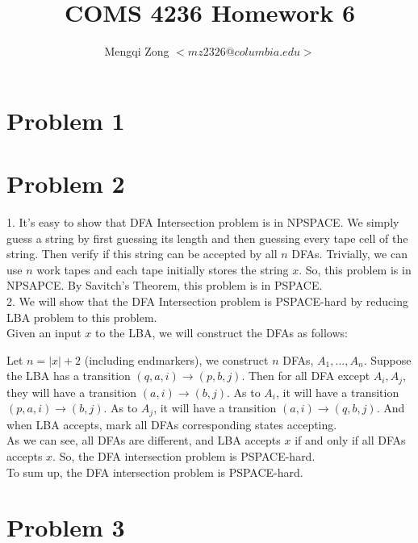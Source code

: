 \documentclass[12pt]{article}
\title{COMS 4236 Homework 6}
\author{Mengqi Zong $<mz2326@columbia.edu>$}
\begin{document}
\maketitle

\setlength{\parindent}{0in}

\section*{Problem 1}



\section*{Problem 2}

1. It's easy to show that DFA Intersection problem is in NPSPACE. We
simply guess a string by first guessing its length and then guessing
every tape cell of the string. Then verify if this string can be
accepted by all $n$ DFAs. Trivially, we can use $n$ work tapes and
each tape initially stores the string $x$. So, this problem is in
NPSAPCE. By Savitch's Theorem, this problem is in PSPACE. \\

2. We will show that the DFA Intersection problem is PSPACE-hard
by reducing LBA problem to this problem. \\

Given an input $x$ to the LBA, we will construct the DFAs as follows:

Let $n = |x| + 2$ (including endmarkers), we construct $n$ DFAs,
$A_1,...,A_n$. Suppose the LBA has a transition $(q, a, i) \rightarrow
(p, b, j)$. Then for all DFA except $A_i, A_j$, they will have a
transition $(a, i) \rightarrow (b, j)$. As to $A_i$, it will have a
transition $(p, a, i) \rightarrow (b, j)$. As to $A_j$, it will have a
transition $(a, i) \rightarrow (q, b, j)$. And when LBA accepts, mark
all DFAs corresponding states accepting. \\

As we can see, all DFAs are different, and LBA accepts $x$ if and only
if all DFAs accepts $x$. So, the DFA intersection problem is
PSPACE-hard. \\

To sum up, the DFA intersection problem is PSPACE-hard.  

\section*{Problem 3}
\end{document}
